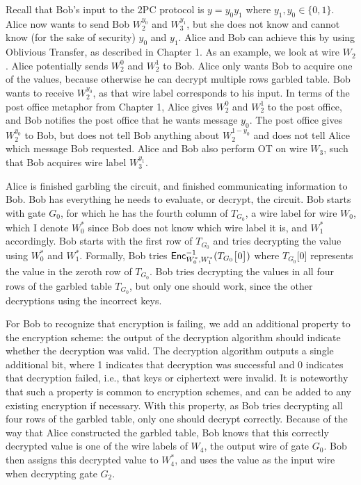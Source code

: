 Recall that Bob's input to the 2PC protocol is $y = y_0 y_1$ where $y_1, y_0 \in \{0,1\}$.
Alice now wants to send Bob $W_2^{y_0}$ and $W_3^{y_1}$, but she does not know and cannot know (for the sake of security) $y_0$ and $y_1$.
Alice and Bob can achieve this by using Oblivious Transfer, as described in Chapter 1.
As an example, we look at wire $W_2$.
Alice potentially sends $W_2^0$ and $W_2^1$ to Bob.
Alice only wants Bob to acquire one of the values, because otherwise he can decrypt multiple rows garbled table.
Bob wants to receive $W_2^{y_0}$, as that wire label corresponds to his input.
In terms of the post office metaphor from Chapter 1, Alice gives $W_2^0$ and $W_2^1$ to the post office, and Bob notifies the post office that he wants message $y_0$.
The post office gives $W_2^{y_0}$ to Bob, but does not tell Bob anything about $W_2^{1 - y_0}$ and does not tell Alice which message Bob requested. 
Alice and Bob also perform OT on wire $W_3$, such that Bob acquires wire label $W_3^{y_1}$.

Alice is finished garbling the circuit, and finished communicating information to Bob. 
Bob has everything he needs to evaluate, or decrypt, the circuit.
Bob starts with gate $G_0$, for which he has the fourth column of $T_{G_0}$, a wire label for wire $W_0$, which I denote $W_0^*$ since Bob does not know which wire label it is, and $W_1^*$ accordingly.
Bob starts with the first row of $T_{G_0}$ and tries decrypting the value using $W_0^*$ and $W_1^*$.
Formally, Bob tries $\textsf{Enc}^{-1}_{W_0^*, W_1^*}(T_{G_0}\big[0\big])$ where $T_{G_0}\big[0\big]$ represents the value in the zeroth row of $T_{G_0}$.
Bob tries decrypting the values in all four rows of the garbled table $T_{G_0}$, but only one should work, since the other decryptions using the incorrect keys.

For Bob to recognize that encryption is failing, we add an additional property to the encryption scheme: the output of the decryption algorithm should indicate whether the decryption was valid.
The decryption algorithm outputs a single additional bit, where 1 indicates that decryption was successful and 0 indicates that decryption failed, i.e., that keys or ciphertext were invalid.
It is noteworthy that such a property is common to encryption schemes, and can be added to any existing encryption if necessary.
With this property, as Bob tries decrypting all four rows of the garbled table, only one should decrypt correctly.
Because of the way that Alice constructed the garbled table, Bob knows that this correctly decrypted value is one of the wire labels of $W_4$, the output wire of gate $G_0$.
Bob then assigns this decrypted value to $W_4^*$, and uses the value as the input wire when decrypting gate $G_2$.

